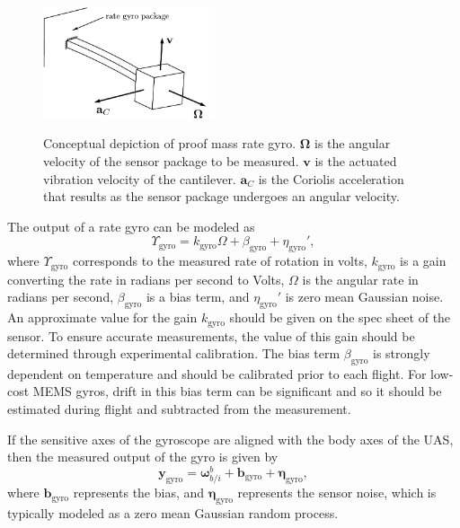 \begin{figure}
  \centering
  \includegraphics[width=0.45\textwidth]{chap11_attitude_estimation/figures/sensors-rate-gyro}\\
  \caption{Conceptual depiction of proof mass rate gyro. $\boldsymbol{\Omega}$ is the angular velocity of the sensor package to be measured. $\mathbf{v}$ is the actuated vibration velocity of the cantilever. $\mathbf{a}_C$ is the Coriolis acceleration that results as the sensor package undergoes an angular velocity.}
  \label{fig:sensors-rate-gyro}
\end{figure}

The output of a rate gyro can be modeled as
\[
\Upsilon_{\text{gyro}} = k_{\text{gyro}} \Omega + \beta_{\text{gyro}} + \eta_{\text{gyro}}',
\]
where $\Upsilon_{\text{gyro}}$ corresponds to the measured rate of rotation in volts,
$k_{\text{gyro}}$ is a gain converting the rate in radians per second to Volts, $\Omega$ is
the angular rate in radians per second, $\beta_{\text{gyro}}$ is a bias
term, and $\eta_{\text{gyro}}'$ is zero mean Gaussian noise.  An approximate value for the gain
$k_{\text{gyro}}$ should be given on the spec sheet of the sensor.  To ensure accurate measurements,
the value of this gain should be determined through experimental calibration.  The bias
term $\beta_{\text{gyro}}$ is strongly dependent on temperature and should be calibrated prior
to each flight. For low-cost MEMS gyros, drift in this bias term can be significant and so it should be estimated during flight and subtracted from the measurement.  

If the sensitive axes of the gyroscope are aligned with the body axes of the UAS, then the measured output of the gyro is given by
\begin{equation}
\mathbf{y}_{\text{gyro}} = \boldsymbol{\omega}_{b/i}^b + \mathbf{b}_{\text{gyro}} + \boldsymbol{\eta}_{\text{gyro}},
                          \label{eq:gyro_measurement}
\end{equation}
where $\mathbf{b}_{\text{gyro}}$ represents the bias, and $\boldsymbol{\eta}_{\text{gyro}}$ represents the sensor noise, which is typically modeled as a zero mean Gaussian random process.

